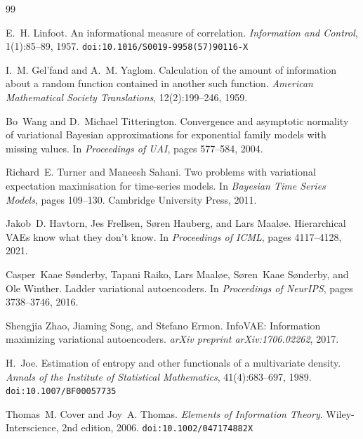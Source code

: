 \documentclass[10pt]{article} %
\theoremstyle{plain}
\theoremstyle{definition}
\begin{document}
\small
\begin{thebibliography}{99}

E.~H. Linfoot.
\newblock An informational measure of correlation.
\newblock \emph{Information and Control}, 1(1):85--89, 1957.
\newblock \texttt{doi:10.1016/S0019-9958(57)90116-X}

I.~M. Gel'fand and A.~M. Yaglom.
\newblock Calculation of the amount of information about a random function contained in another such function.
\newblock \emph{American Mathematical Society Translations}, 12(2):199--246, 1959.

Bo~Wang and D.~Michael Titterington.
\newblock Convergence and asymptotic normality of variational {Bayesian} approximations for exponential family models with missing values.
\newblock In \emph{Proceedings of UAI}, pages 577--584, 2004.

Richard~E. Turner and Maneesh Sahani.
\newblock Two problems with variational expectation maximisation for time-series models.
\newblock In \emph{Bayesian Time Series Models}, pages 109--130. Cambridge University Press, 2011.

Jakob~D. Havtorn, Jes Frellsen, S{\o}ren Hauberg, and Lars Maal{\o}e.
\newblock Hierarchical {VAEs} know what they don't know.
\newblock In \emph{Proceedings of ICML}, pages 4117--4128, 2021.

Casper~Kaae S{\o}nderby, Tapani Raiko, Lars Maal{\o}e, S{\o}ren~Kaae S{\o}nderby, and Ole Winther.
\newblock Ladder variational autoencoders.
\newblock In \emph{Proceedings of NeurIPS}, pages 3738--3746, 2016.

Shengjia Zhao, Jiaming Song, and Stefano Ermon.
\newblock Info{VAE}: Information maximizing variational autoencoders.
\newblock \emph{arXiv preprint arXiv:1706.02262}, 2017.

H.~Joe.
\newblock Estimation of entropy and other functionals of a multivariate density.
\newblock \emph{Annals of the Institute of Statistical Mathematics}, 41(4):683--697, 1989.
\newblock \texttt{doi:10.1007/BF00057735}

Thomas~M. Cover and Joy~A. Thomas.
\newblock \emph{Elements of Information Theory}.
\newblock Wiley-Interscience, 2nd edition, 2006.
\newblock \texttt{doi:10.1002/047174882X}


\end{thebibliography}
\end{document}
